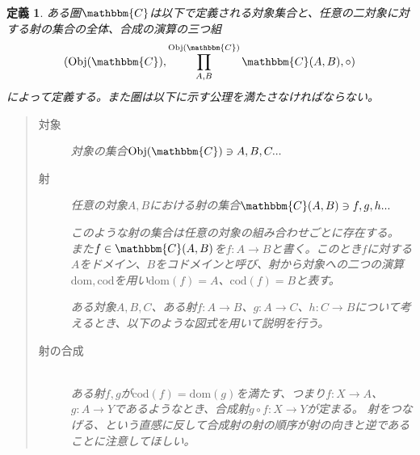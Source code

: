\documentclass[dvipdfmx]{jsarticle}
\newcommand{\cat}[1]{\mathbbm{#1}}
\newcommand{\arrow}{\rightarrow}
\newcommand{\obj}[1]{\mathrm{Obj}(\cat{#1})}
\newcommand{\mor}[3]{#1:#2\arrow #3}
\newcommand{\dom}{\mathrm{dom}}
\newcommand{\cod}{\mathrm{cod}}
\newcommand{\arset}[3]{\cat{#1}(#2,#3)}
\newtheorem{define}{定義}[section]
\numberwithin{proof}{subsection}
\numberwithin{prop}{subsection}
\numberwithin{define}{subsection}
\begin{document}
	\begin{define}
		ある圏$\cat{C}$は以下で定義される対象集合と、任意の二対象に対する射の集合の全体、合成の演算の三つ組\[(\obj{C},\prod\limits_{A,B}^{\obj{C}}\arset{C}{A}{B},\circ)\]によって定義する。また圏は以下に示す公理を満たさなければならない。
		\begin{quote}
			\begin{description}
			\item[対象] 対象の集合$\obj{C}\ni A,B,C...$
			\item[射] 任意の対象$A,B$における射の集合$\arset{C}{A}{B}\ni f,g,h...$

			このような射の集合は任意の対象の組み合わせごとに存在する。
			また$f\in\arset{C}{A}{B}$を$\mor{f}{A}{B}$と書く。このとき$f$に対する$A$をドメイン、$B$をコドメインと呼び、射から対象への二つの演算$\dom,\cod$を用い$\dom(f)=A$、$\cod(f)=B$と表す。

			ある対象$A,B,C$、ある射$\mor{f}{A}{B}$、$\mor{g}{A}{C}$、$\mor{h}{C}{B}$について考えるとき、以下のような図式を用いて説明を行う。
			\begin{center}
			\end{center}

			\item[射の合成]~\\ ある射$f,g$が$\cod(f)=\dom(g)$を満たす、つまり$\mor{f}{X}{A}$、$\mor{g}{A}{Y}$であるようなとき、合成射$\mor{g\circ f}{X}{Y}$が定まる。
			射をつなげる、という直感に反して合成射の射の順序が射の向きと逆であることに注意してほしい。


\end{description}
\end{quote}
\end{define}
\end{document}
